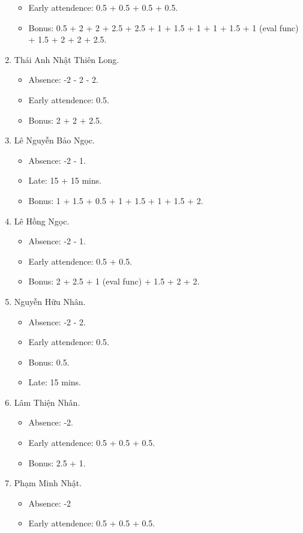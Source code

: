 \documentclass{article}
\begin{document}
\begin{enumerate}
	\begin{itemize}
		\item Early attendence: 0.5 + 0.5 + 0.5 + 0.5.
		\item Bonus: 0.5 + 2 + 2 + 2.5 + 2.5 + 1 + 1.5 + 1 + 1 + 1.5 + 1 (eval func) + 1.5 + 2 + 2 + 2.5.
	\end{itemize}
	\item {\sc Thái Anh Nhật Thiên Long.}
	\begin{itemize}
		\item Absence: -2 - 2 - 2.
		\item Early attendence: 0.5.
		\item Bonus: 2 + 2 + 2.5.
	\end{itemize}
	\item {\sc Lê Nguyễn Bảo Ngọc.}
	\begin{itemize}
		\item Absence: -2 - 1.
		\item Late: 15 + 15 mins.
		\item Bonus: 1 + 1.5 + 0.5 + 1 + 1.5 + 1 + 1.5 + 2.
	\end{itemize}
	\item {\sc Lê Hồng Ngọc.}
	\begin{itemize}
		\item Absence: -2 - 1.
		\item Early attendence: 0.5 + 0.5.
		\item Bonus: 2 + 2.5 + 1 (eval func) + 1.5 + 2 + 2.
	\end{itemize}
	\item {\sc Nguyễn Hữu Nhân.}
	\begin{itemize}
		\item Absence: -2 - 2.
		\item Early attendence: 0.5.
		\item Bonus: 0.5.
		\item Late: 15 mins.
	\end{itemize}
	\item {\sc Lâm Thiện Nhân.}
	\begin{itemize}
		\item Absence: -2.
		\item Early attendence: 0.5 + 0.5 + 0.5.
		\item Bonus: 2.5 + 1.
	\end{itemize}
	\item {\sc Phạm Minh Nhật.}
	\begin{itemize}
		\item Absence: -2
		\item Early attendence: 0.5 + 0.5 + 0.5.

\end{itemize}
\end{enumerate}
\end{document}
